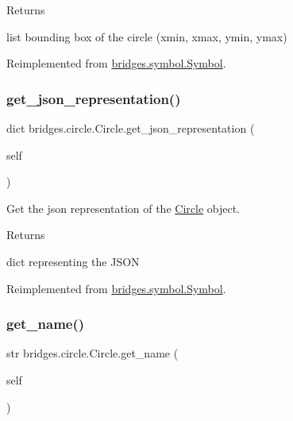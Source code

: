 \begin{DoxyReturn}{Returns}


list bounding box of the circle (xmin, xmax, ymin, ymax) 
\end{DoxyReturn}


Reimplemented from \mbox{\hyperlink{classbridges_1_1symbol_1_1_symbol_a18aa1240a141ec2621322e37471eae30}{bridges.\+symbol.\+Symbol}}.

\mbox{\label{classbridges_1_1circle_1_1_circle_ad694ef551d1d26078bddbecaed711ca1}} 
\subsubsection{\texorpdfstring{get\_json\_representation()}{get\_json\_representation()}}
{\footnotesize\ttfamily  dict bridges.\+circle.\+Circle.\+get\+\_\+json\+\_\+representation (\begin{DoxyParamCaption}\item[{}]{self }\end{DoxyParamCaption})}



Get the json representation of the \mbox{\hyperlink{classbridges_1_1circle_1_1_circle}{Circle}} object. 

\begin{DoxyReturn}{Returns}


dict representing the J\+S\+ON 
\end{DoxyReturn}


Reimplemented from \mbox{\hyperlink{classbridges_1_1symbol_1_1_symbol_a891a710ff160439aa6dc476ce057f22e}{bridges.\+symbol.\+Symbol}}.

\mbox{\label{classbridges_1_1circle_1_1_circle_ac43bc12d5cba70022c99b2e5aa9303f8}} 
\subsubsection{\texorpdfstring{get\_name()}{get\_name()}}
{\footnotesize\ttfamily  str bridges.\+circle.\+Circle.\+get\+\_\+name (\begin{DoxyParamCaption}\item[{}]{self }\end{DoxyParamCaption})}



